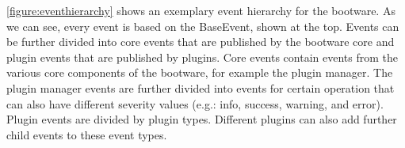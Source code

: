 \autoref{figure:eventhierarchy} shows an exemplary event hierarchy for the bootware.
As we can see, every event is based on the BaseEvent, shown at the top.
Events can be further divided into core events that are published by the bootware core and plugin events that are published by plugins.
Core events contain events from the various core components of the bootware, for example the plugin manager.
The plugin manager events are further divided into events for certain operation that can also have different severity values (e.g.: info, success, warning, and error).
Plugin events are divided by plugin types.
Different plugins can also add further child events to these event types.
